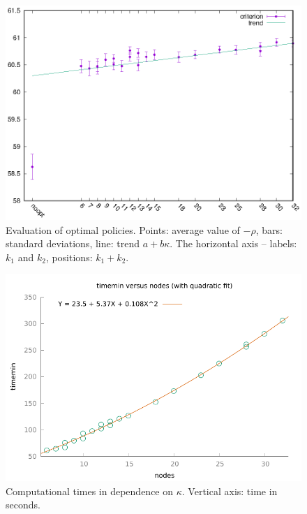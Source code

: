 \documentclass{article}              %
\begin{document}
\begin{figure}
\begin{center}
\includegraphics{mcvs025}

\caption{Evaluation of optimal policies. Points: average value of $-\rho$, bars: standard deviations, line: trend $a+b\kappa$. The horizontal axis -- labels: $k_1$ and $k_2$, positions: $k_1+k_2$. }


\label{fig:mcvs}
\end{center}
\end{figure}

\begin{figure}
\begin{center}
\includegraphics{times}\caption{Computational times in dependence on $\kappa$. Vertical axis: time in seconds. }
\label{fig:times}

\end{center}
\end{figure}
\end{document}

